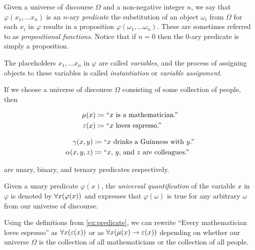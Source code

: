 \begin{definition}[Predicate]
    Given a universe of discourse \(\Omega\) and a non-negative integer \(n\),
    we say that \(\varphi(x_1, \dots x_n)\) is an \(n\)-ary \emph{predicate}
    \iffbydefn the substitution of an object \(\omega_i\) from \(\Omega\) for each \(x_i\) in \(\varphi\)
    results in a proposition \(\varphi(\omega_1, \dots \omega_n)\).
    These are sometimes referred to as \emph{propositional functions}.
    Notice that if \(n = 0\) then the \(0\)-ary predicate is simply a proposition.

    The placeholders \(x_1, \dots x_n\) in \(\varphi\) are called \emph{variables},
    and the process of assigning objects to these variables is called
    \emph{instantiation} or \emph{variable assignment}.
\end{definition}
\begin{example}\label{ex:predicate}
    If we choose a universe of discourse \(\Omega\) consisting of some collection of people, then

    \begin{minipage}{.45\linewidth}
        \vspace{-\parskip-\abovedisplayskip}
        \begin{align*}
            \mu(x) &\coloneqq \text{``}x \text{ is a mathematician.''}\\
            \varepsilon(x) &\coloneqq \text{``}x \text{ loves espresso.''}
        \end{align*}
    \end{minipage}%
    \begin{minipage}{.45\linewidth}
        \vspace{-\parskip-\abovedisplayskip}
        \begin{align*}
            \gamma(x, y) &\coloneqq \text{``}x \text{ drinks a Guinness with } y\text{.''}\\
            \alpha(x, y, z) &\coloneqq \text{``}x\text{, }y\text{, and } z \text{ are colleagues.''}
        \end{align*}
    \end{minipage}

    are unary, binary, and ternary predicates respectively.
\end{example}

\begin{definition}
    Given a unary predicate \(\varphi(x)\),
    the \emph{universal quantification} of the variable \(x\) in \(\varphi\)
    is denoted by \(\forall x \pn*{\varphi(x)}\)
    and expresses that \(\varphi(\omega)\) is true for any arbitrary \(\omega\) from our universe of discourse.
\end{definition}
\begin{example}
    Using the definitions from \autoref{ex:predicate},
    we can rewrite ``Every mathematician loves espresso'' as
    \(\forall x \pn*{\varepsilon(x)}\) or as \(\forall x \pn*{\mu(x) \rightarrow \varepsilon(x)}\)
    depending on whether our universe \(\Omega\)
    is the collection of all mathematicians or the collection of all people.
\end{example}


